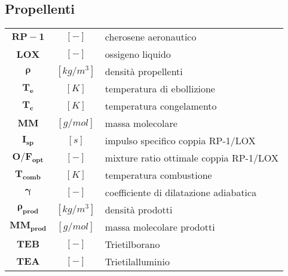 \begin{multicols}{2}
	\subsection{Propellenti}
	\begin{tabular}{ccl}
		$\bm{RP-1 }$ & $[-]$ & cherosene aeronautico \\
		$\bm{LOX }$ & $[-]$ & ossigeno liquido \\
		$\bm{\rho }$ & $[kg/m^3]$ & densità propellenti \\
	    $\bm{T_{e}}$ & $[K]$ & temperatura di ebollizione \\
	    $\bm{T_{c}}$ & $[K]$ & temperatura congelamento \\
		$\bm{MM}$ & $[g/mol]$ & massa molecolare \\
	    $\bm{I_{sp}}$ & $[s]$ & impulso specifico coppia RP-1/LOX \\
	    $\bm{O/F_{opt}}$ & $[-]$ & mixture ratio ottimale coppia RP-1/LOX \\
		$\bm{T_{comb}}$ & $[K]$ & temperatura combustione \\
	    $\bm{\gamma}$ & $[-]$ & coefficiente di dilatazione adiabatica \\
	    $\bm{\rho_{prod}}$ & $[kg/m^3]$ & densità prodotti \\
		$\bm{MM_{prod}}$ & $[g/mol]$ & massa molecolare prodotti \\
	    $\bm{TEB}$ & $[-]$ & Trietilborano \\
	    $\bm{TEA}$ & $[-]$ & Trietilalluminio
	\end{tabular}


\end{multicols}
